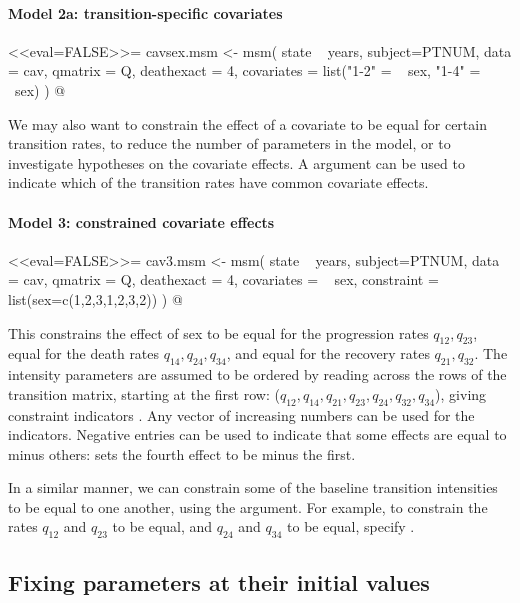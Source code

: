 \paragraph{Model 2a: transition-specific covariates}
<<eval=FALSE>>=
cavsex.msm <- msm( state ~ years, subject=PTNUM, data = cav,
                  qmatrix = Q, deathexact = 4,
                  covariates = list("1-2" = ~ sex, "1-4" = ~sex) )
@

We may also want to constrain the effect of a covariate to be equal for
certain transition rates, to reduce the number of parameters in the
model, or to investigate hypotheses on the covariate effects.  A
 argument can be used to indicate which of the
transition rates have common covariate effects.

\paragraph{Model 3: constrained covariate effects}

<<eval=FALSE>>=
cav3.msm <- msm( state ~ years, subject=PTNUM, data = cav,
                qmatrix = Q, deathexact = 4,
                covariates = ~ sex,
                constraint = list(sex=c(1,2,3,1,2,3,2)) )
@

This constrains the effect of sex to be equal for the progression
rates $q_{12}, q_{23}$, equal for the death rates $q_{14}, q_{24},
q_{34}$, and equal for the recovery rates $q_{21}, q_{32}$. The
intensity parameters are assumed to be ordered by reading across the
rows of the transition matrix, starting at the first row: ($q_{12},
q_{14}, q_{21}, q_{23}, q_{24}, q_{32}, q_{34}$), giving constraint
indicators .  Any vector of increasing
numbers can be used for the indicators.  Negative entries can be used
to indicate that some effects are equal to minus others:
 sets the fourth effect to be minus the
first.

In a similar manner, we can constrain some of the baseline transition
intensities to be equal to one another, using the
 argument.  For example, to constrain the rates
$q_{12}$ and $q_{23}$ to be equal, and $q_{24}$ and $q_{34}$ to be
equal, specify .



\subsection{Fixing parameters at their initial values}

